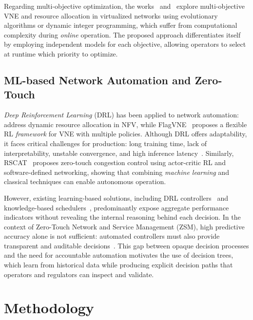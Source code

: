 \documentclass[a4paper,twoside]{article}
\begin{document}
Regarding multi-objective optimization, the works~\cite{song2020multiobjective} and~\cite{belgacem2016multiobjective} explore multi-objective VNE and resource allocation in virtualized networks using evolutionary algorithms or dynamic integer programming, which suffer from computational complexity during \textit{online} operation.
The proposed approach differentiates itself by employing independent models for each objective, allowing operators to select at runtime which priority to optimize.

\subsection{ML-based Network Automation and Zero-Touch}
\label{subsec:ml-zerotouchj}

\textit{Deep Reinforcement Learning} (DRL) has been applied to network automation: \cite{cao2018nfv-deeprl} address dynamic resource allocation in NFV, while FlagVNE~\cite{ijcai-2024-flagvne} proposes a flexible RL \textit{framework} for VNE with multiple policies.
Although DRL offers adaptability, it faces critical challenges for production: long training time, lack of interpretability, unstable convergence, and high inference latency~\cite{white2024zerotough}.
Similarly, RSCAT~\cite{diel2023rscat} proposes zero-touch congestion control using actor-critic RL and software-defined networking, showing that combining \textit{machine learning} and classical techniques can enable autonomous operation.

However, existing learning-based solutions, including DRL controllers~\cite{cao2018nfv-deeprl,ijcai-2024-flagvne} and knowledge-based schedulers~\cite{koslowski2025knowledge-based,diel2023rscat}, predominantly expose aggregate performance indicators without revealing the internal reasoning behind each decision.
In the context of Zero-Touch Network and Service Management (ZSM), high predictive accuracy alone is not sufficient: automated controllers must also provide transparent and auditable decisions~\cite{white2024zerotough}.
This gap between opaque decision processes and the need for accountable automation motivates the use of decision trees, which learn from historical data while producing explicit decision paths that operators and regulators can inspect and validate.


\section{Methodology}
\label{sec:Proposal}
\end{document}
